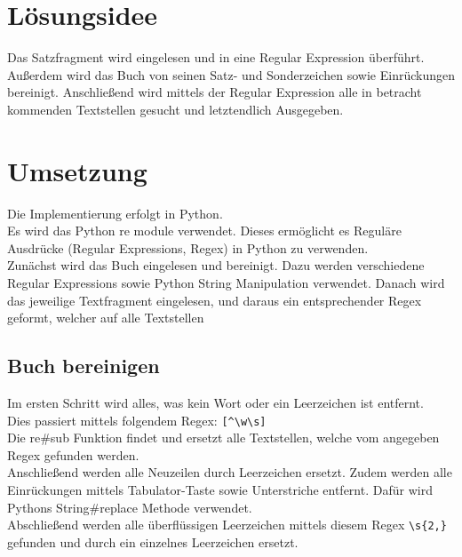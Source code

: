 \maketitle
\tableofcontents

\vspace{0.5cm}


\section{Lösungsidee}\label{sec:losungsidee}
Das Satzfragment wird eingelesen und in eine Regular Expression überführt.
Außerdem wird das Buch von seinen Satz- und Sonderzeichen sowie Einrückungen bereinigt.
Anschließend wird mittels der Regular Expression alle in betracht kommenden Textstellen gesucht
und letztendlich Ausgegeben.


\section{Umsetzung}\label{sec:umsetzung}
Die Implementierung erfolgt in Python. \\
Es wird das Python re module verwendet.
Dieses ermöglicht es Reguläre Ausdrücke (Regular Expressions, Regex) in Python zu verwenden. \\
Zunächst wird das Buch eingelesen und bereinigt.
Dazu werden verschiedene Regular Expressions sowie Python String Manipulation verwendet.
Danach wird das jeweilige Textfragment eingelesen, und daraus ein entsprechender Regex geformt, welcher
auf alle Textstellen

\subsection{Buch bereinigen}\label{subsec:buch-bereinigen}
Im ersten Schritt wird alles, was kein Wort oder ein Leerzeichen ist entfernt. \\
Dies passiert mittels folgendem Regex: \verb/[^\w\s]/ \\
Die re\#sub Funktion findet und ersetzt alle Textstellen, welche vom angegeben Regex gefunden werden. \\
Anschließend werden alle Neuzeilen durch Leerzeichen ersetzt.
Zudem werden alle Einrückungen mittels Tabulator-Taste sowie Unterstriche entfernt.
Dafür wird Pythons String\#replace Methode verwendet.\\
Abschließend werden alle überflüssigen Leerzeichen mittels diesem Regex \verb/\s{2,}/ gefunden und durch ein einzelnes
Leerzeichen ersetzt.


